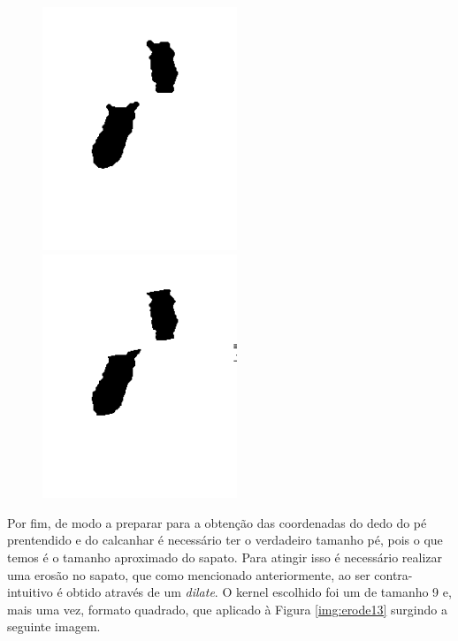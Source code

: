 \documentclass[a4paper]{report}
\begin{document}
\begin{figure}[H]
\centering
\begin{minipage}{.5\textwidth}
  \centering
    \includegraphics[width=0.52\textwidth]{images/building/closeDilate/disk.png}
\end{minipage}%
\begin{minipage}{.5\textwidth}
  \centering
    \includegraphics[width=0.52\textwidth]{images/building/closeDilate/line.png}
\end{minipage}%
\end{figure}

Por fim, de modo a preparar para a obtenção das coordenadas do dedo do pé prentendido e do
calcanhar é necessário ter o verdadeiro tamanho pé, pois o que temos é o tamanho aproximado
do sapato. Para atingir isso é necessário realizar uma erosão no sapato, que como mencionado
anteriormente, ao ser contra-intuitivo é obtido através de um \textit{dilate}. O kernel escolhido
foi um de tamanho 9 e, mais uma vez, formato quadrado, que aplicado à Figura \ref{img:erode13}
surgindo a seguinte imagem.
\end{document}
